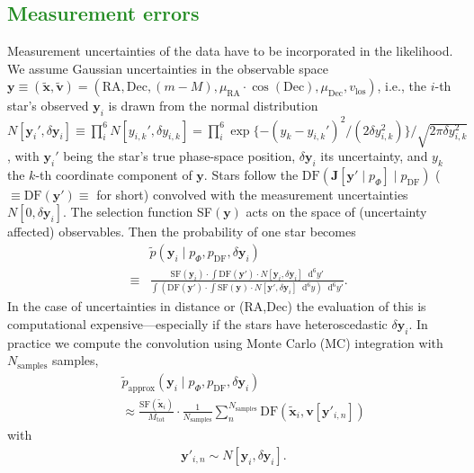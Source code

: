 \documentclass[iop,revtex4]{emulateapj}
\newcommand{\vect}[1]{\boldsymbol{#1}}
\newcommand*\Diff[1]{\mathop{}\!\mathrm{d^#1}}
\newcommand{\NEW}[1]{\textcolor{ForestGreen}{#1}}
\begin{document}
\subsection{\NEW{Measurement errors}}

Measurement uncertainties of the data have to be incorporated in the likelihood. We assume Gaussian uncertainties in the observable space $\vect{y} \equiv (\tilde{\vect{x}},\tilde{\vect{v}})=(\text{RA},\text{Dec},(m-M),\mu_\text{RA} \cdot \cos (\text{Dec}),\mu_\text{Dec},v_\text{los})$, i.e., the $i$-th star's observed $\vect{y}_i$ is drawn from the normal distribution $N[{\vect{y}_i}',\delta \vect{y}_i] \equiv \prod_i^6 N[{y_{i,k}}',\delta y_{i,k}] =  \prod_i^6 \exp \{-(y_{k}-{y_{i,k}}')^2/ (2 \delta y_{i,k}^2) \} / \sqrt{2 \pi \delta y_{i,k}^2}$, with ${\vect{y}_i}'$ being the star's true phase-space position, $\delta \vect{y}_i$ its uncertainty, and $y_k$ the $k$-th coordinate component of $\vect{y}$. Stars follow the $\text{DF}(\vect{J}[\vect{y}' \mid p_\Phi] \mid p_\text{DF})$ ($\equiv \text{DF}(\vect{y}') \equiv$  for short) convolved with the measurement uncertainties $N[0,\delta \vect{y}_i]$. The selection function SF$(\vect{y})$ acts on the space of (uncertainty affected) observables. Then the probability of one star becomes
\begin{eqnarray}
&&\tilde{p}(\vect{y}_i \mid p_\Phi,p_\text{DF},\delta \vect{y}_i)\nonumber\\
& \equiv& \frac{\text{SF}(\vect{y}_i) \cdot \int \text{DF}(\vect{y}') \cdot N[\vect{y}_i,\delta \vect{y}_i] \Diff{6} y'}{\int \left(  \text{DF}(\vect{y}')  \cdot  \int \text{SF}(\vect{y})  \cdot N[\vect{y}',\delta \vect{y}_i] \Diff{6} y \right) \Diff{6}y'}.
\end{eqnarray}
In the case of uncertainties in distance or (RA,Dec) the evaluation of this is computational expensive---especially if the stars have heteroscedastic $\delta \vect{y}_i$. In practice we compute the convolution using Monte Carlo (MC) integration with $N_\text{samples}$ samples,
\begin{eqnarray}
&&\tilde{p}_\text{approx}(\vect{y}_i \mid p_\Phi,p_\text{DF},\delta \vect{y}_i) \nonumber\\
&&\approx \frac{ \text{SF}(\tilde{\vect{x}}_i)}{M_\text{tot}} \cdot \frac{1}{N_\text{samples}} \sum_n^{N_\text{samples}}  \text{DF}(\tilde{\vect{x}}_i,\vect{v}[\vect{y}'_{i,n}]) \label{eq:errorconv}
\end{eqnarray}
with
\begin{eqnarray}
\vect{y}'_{i,n} \sim N[\vect{y}_i,\delta \vect{y}_i].\nonumber
\end{eqnarray}
\end{document}
